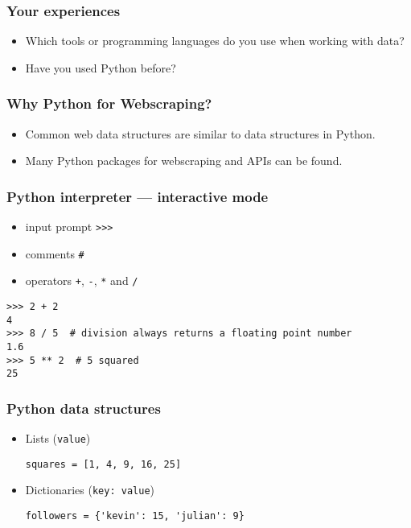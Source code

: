 
\begin{frame}
    \frametitle{Your experiences}
    \begin{itemize}
        \item Which tools or programming languages do you use when
        working with data?
        \item Have you used Python before?
    \end{itemize}
\end{frame}

\begin{frame}
    \frametitle{Why Python for Webscraping?}
    \begin{itemize}
        \item<1:> Common web data structures are similar to data
        structures in Python.
        \item<2:> Many Python packages for webscraping and APIs can be
        found.
    \end{itemize}
\end{frame}

\begin{frame}[fragile]
    \frametitle{Python interpreter --- interactive mode}
    \begin{itemize}
        \item input prompt \texttt{>>>}
        \item comments \texttt{#}
        \item operators \texttt{+}, \texttt{-}, \texttt{*} and \texttt{/}
    \end{itemize}
\begin{verbatim}
>>> 2 + 2
4
>>> 8 / 5  # division always returns a floating point number
1.6
>>> 5 ** 2  # 5 squared
25
\end{verbatim}
\end{frame}

\begin{frame}[fragile]
    \frametitle{Python data structures}
    \begin{itemize}
        \item Lists (\texttt{value})\\
\begin{verbatim}
squares = [1, 4, 9, 16, 25]
\end{verbatim}
        \item Dictionaries (\texttt{key: value})\\
\begin{verbatim}
followers = {'kevin': 15, 'julian': 9}
\end{verbatim}
    \end{itemize}
\end{frame}

